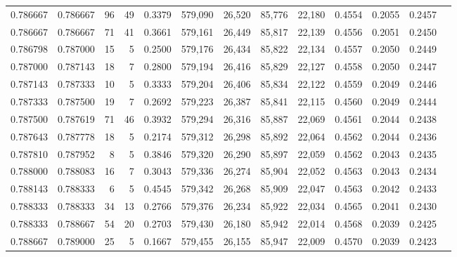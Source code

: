 \begin{tabular}{rrrrrrrrrrrrr}
0.786667 & 0.786667 &    96 &  49 &                                     0.3379 & 579,090 &  26,520 &  85,776 &  22,180 & 0.4554 & 0.2055 & 0.2457 \\
0.786667 & 0.786667 &    71 &  41 &                                     0.3661 & 579,161 &  26,449 &  85,817 &  22,139 & 0.4556 & 0.2051 & 0.2450 \\
0.786798 & 0.787000 &    15 &   5 &                                     0.2500 & 579,176 &  26,434 &  85,822 &  22,134 & 0.4557 & 0.2050 & 0.2449 \\
0.787000 & 0.787143 &    18 &   7 &                                     0.2800 & 579,194 &  26,416 &  85,829 &  22,127 & 0.4558 & 0.2050 & 0.2447 \\
0.787143 & 0.787333 &    10 &   5 &                                     0.3333 & 579,204 &  26,406 &  85,834 &  22,122 & 0.4559 & 0.2049 & 0.2446 \\
0.787333 & 0.787500 &    19 &   7 &                                     0.2692 & 579,223 &  26,387 &  85,841 &  22,115 & 0.4560 & 0.2049 & 0.2444 \\
0.787500 & 0.787619 &    71 &  46 &                                     0.3932 & 579,294 &  26,316 &  85,887 &  22,069 & 0.4561 & 0.2044 & 0.2438 \\
0.787643 & 0.787778 &    18 &   5 &                                     0.2174 & 579,312 &  26,298 &  85,892 &  22,064 & 0.4562 & 0.2044 & 0.2436 \\
0.787810 & 0.787952 &     8 &   5 &                                     0.3846 & 579,320 &  26,290 &  85,897 &  22,059 & 0.4562 & 0.2043 & 0.2435 \\
0.788000 & 0.788083 &    16 &   7 &                                     0.3043 & 579,336 &  26,274 &  85,904 &  22,052 & 0.4563 & 0.2043 & 0.2434 \\
0.788143 & 0.788333 &     6 &   5 &                                     0.4545 & 579,342 &  26,268 &  85,909 &  22,047 & 0.4563 & 0.2042 & 0.2433 \\
0.788333 & 0.788333 &    34 &  13 &                                     0.2766 & 579,376 &  26,234 &  85,922 &  22,034 & 0.4565 & 0.2041 & 0.2430 \\
0.788333 & 0.788667 &    54 &  20 &                                     0.2703 & 579,430 &  26,180 &  85,942 &  22,014 & 0.4568 & 0.2039 & 0.2425 \\
0.788667 & 0.789000 &    25 &   5 &                                     0.1667 & 579,455 &  26,155 &  85,947 &  22,009 & 0.4570 & 0.2039 & 0.2423 \\

\end{tabular}
